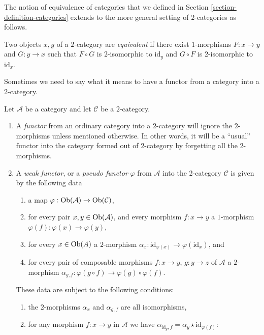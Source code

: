 \noindent
The notion of equivalence of categories that we defined in Section
\ref{section-definition-categories} extends to the more general setting of
$2$-categories as follows.

\begin{definition}
\label{definition-equivalence}
Two objects $x, y$ of a $2$-category are {\it equivalent} if there exist
$1$-morphisms $F : x \to y$ and $G : y \to x$ such that $F \circ G$ is
$2$-isomorphic to $\text{id}_y$ and $G \circ F$ is $2$-isomorphic to
$\text{id}_x$.
\end{definition}

\noindent
Sometimes we need to say what it means to have a functor from a
category into a $2$-category.

\begin{definition}
\label{definition-functor-into-2-category}
Let $\mathcal{A}$ be a category and let $\mathcal{C}$ be a $2$-category.
\begin{enumerate}
\item A {\it functor} from an ordinary category into a $2$-category
will ignore the
$2$-morphisms unless mentioned otherwise. In other words, it will be a
``usual'' functor into the category formed out of 2-category by forgetting
all the 2-morphisms.
\item A {\it weak functor}, or
a {\it pseudo functor} $\varphi$ from $\mathcal{A}$ into the 2-category
$\mathcal{C}$ is given by the following data
\begin{enumerate}
\item a map $\varphi : \mathop{\mathrm{Ob}}\nolimits(\mathcal{A}) \to \mathop{\mathrm{Ob}}\nolimits(\mathcal{C})$,
\item for every pair $x, y\in \mathop{\mathrm{Ob}}\nolimits(\mathcal{A})$, and every
morphism $f : x \to y$ a $1$-morphism $\varphi(f) : \varphi(x) \to \varphi(y)$,
\item for every $x\in \mathop{\mathrm{Ob}}\nolimits(A)$ a $2$-morphism
$\alpha_x : \text{id}_{\varphi(x)} \to \varphi(\text{id}_x)$, and
\item for every pair of composable morphisms $f : x \to y$,
$g : y \to z$ of $\mathcal{A}$ a $2$-morphism
$\alpha_{g, f} : \varphi(g \circ f) \to \varphi(g) \circ \varphi(f)$.
\end{enumerate}
These data are subject to the following conditions:
\begin{enumerate}
\item the $2$-morphisms $\alpha_x$ and $\alpha_{g, f}$ are all
isomorphisms,
\item for any morphism $f : x \to y$ in $\mathcal{A}$ we have
$\alpha_{\text{id}_y, f} = \alpha_y \star \text{id}_{\varphi(f)}$:

\end{enumerate}
\end{enumerate}
\end{definition}
